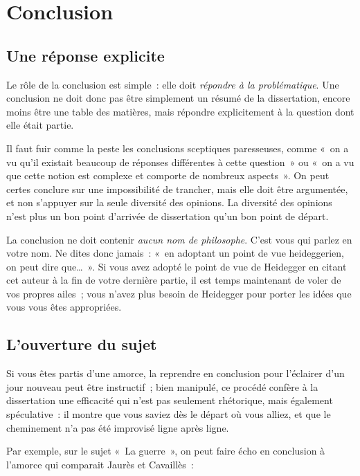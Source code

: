 \documentclass[a4paper,12pt]{article}
\begin{document}
\section{Conclusion}
\label{sec-4}

\subsection{Une réponse explicite}
\label{sec-4-1}

Le rôle de la conclusion est simple : elle doit \emph{répondre à la
problématique}. Une conclusion ne doit donc pas être simplement un
résumé de la dissertation, encore moins être une table des matières,
mais répondre explicitement à la question dont elle était partie.

Il faut fuir comme la peste les conclusions sceptiques paresseuses,
comme « on a vu qu'il existait beaucoup de réponses différentes à cette
question » ou « on a vu que cette notion est complexe et comporte de
nombreux aspects ». On peut certes conclure sur une impossibilité de
trancher, mais elle doit être argumentée, et non s'appuyer sur la seule
diversité des opinions. La diversité des opinions n'est plus un bon
point d'arrivée de dissertation qu'un bon point de départ.

La conclusion ne doit contenir \emph{aucun nom de philosophe}. C'est vous qui
parlez en votre nom. Ne dites donc jamais : « en adoptant un point de vue
heideggerien, on peut dire que\ldots{} ». Si vous avez adopté le point de vue
de Heidegger en citant cet auteur à la fin de votre dernière partie, il
est temps maintenant de voler de vos propres ailes ; vous n'avez plus
besoin de Heidegger pour porter les idées que vous vous êtes
appropriées.

\subsection{L'ouverture du sujet}
\label{sec-4-2}

Si vous êtes partis d'une amorce, la reprendre en conclusion pour
l'éclairer d'un jour nouveau peut être instructif ; bien manipulé, ce
procédé confère à la dissertation une efficacité qui n'est pas seulement
rhétorique, mais également spéculative : il montre que vous saviez dès
le départ où vous alliez, et que le cheminement n'a pas été improvisé
ligne après ligne.

Par exemple, sur le sujet « La guerre », on peut faire écho en conclusion
à l'amorce qui comparait Jaurès et Cavaillès :
\end{document}
